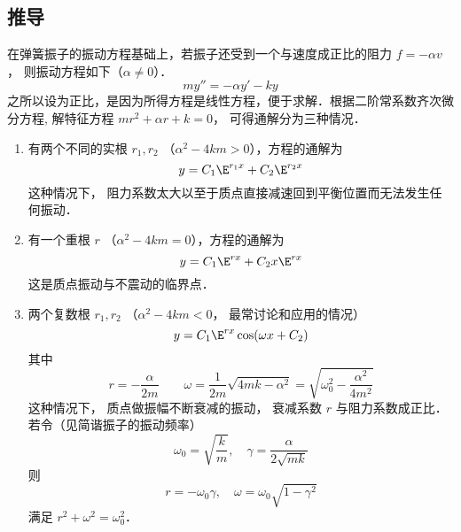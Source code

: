\subsection{推导}
在弹簧振子的振动方程基础上，若振子还受到一个与速度成正比的阻力 $f =  - \alpha v$， 则振动方程如下（$\alpha \ne 0$）．
\begin{equation}
my'' =  - \alpha y' - ky
\end{equation}
之所以设为正比，是因为所得方程是线性方程，便于求解．根据二阶常系数齐次微分方程,
解特征方程 $m{r^2} + \alpha r + k = 0$， 可得通解分为三种情况．
\begin{enumerate}
\item 有两个不同的实根 $r_1,r_2$ （${\alpha ^2} - 4km > 0$），方程的通解为
\begin{equation}
y = C_1 \E^{r_1 x} + C_2 \E^{r_2 x}
\end{equation}
这种情况下， 阻力系数太大以至于质点直接减速回到平衡位置而无法发生任何振动．

\item 有一个重根 $r$ （${\alpha ^2} - 4km = 0$），方程的通解为
\begin{equation}
y = {C_1}{\E^{rx}} + {C_2}x{\E^{rx}}
\end{equation}
这是质点振动与不震动的临界点．

\item 两个复数根 $r_1,r_2$ （${\alpha ^2} - 4km < 0$， 最常讨论和应用的情况）
\begin{equation}
y = C_1 \E^{rx}\cos(\omega x + C_2)
\end{equation}
其中
\begin{equation}
r =  - \frac{\alpha }{2m}
\qquad
\omega = \frac{1}{2m}\sqrt {4mk - {\alpha ^2}}  = \sqrt {\omega _0^2 - \frac{\alpha ^2}{4 m^2}}
\end{equation}
这种情况下， 质点做振幅不断衰减的振动， 衰减系数 $r$ 与阻力系数成正比． 若令（见简谐振子的振动频率）
\begin{equation}
{\omega _0} = \sqrt {\frac{k}{m}},\quad {\gamma  = \frac{\alpha }{2\sqrt{mk}}}
\end{equation}
则 
\begin{equation}
r =  - {\omega _0}\gamma,\quad \omega  = {\omega _0}\sqrt {1 - {\gamma ^2}}
\end{equation}
满足
${r^2} + {\omega ^2} = \omega _0^2$．


\end{enumerate}



